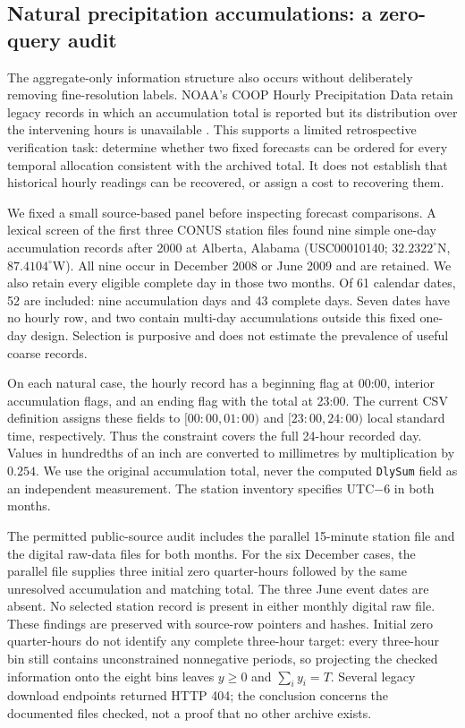 \documentclass[12pt]{article}
\begin{document}
\subsection{Natural precipitation accumulations: a zero-query audit}
\label{sec:noaa-natural}
The aggregate-only information structure also occurs without deliberately
removing fine-resolution labels. NOAA's COOP Hourly Precipitation Data retain
legacy records in which an accumulation total is reported but its distribution
over the intervening hours is unavailable \cite{noaa_hpd_v2,noaa_hpd_format}.
This supports a limited retrospective verification task: determine whether two
fixed forecasts can be ordered for every temporal allocation consistent with
the archived total. It does not establish that historical hourly readings can
be recovered, or assign a cost to recovering them.

We fixed a small source-based panel before inspecting forecast comparisons.
A lexical screen of the first three CONUS station files found nine simple
one-day accumulation records after 2000 at Alberta, Alabama
(USC00010140; $32.2322^{\circ}$N, $87.4104^{\circ}$W). All nine occur in December
2008 or June 2009 and are retained. We also retain every eligible complete day
in those two months. Of 61 calendar dates, 52 are included: nine accumulation
days and 43 complete days. Seven dates have no hourly row, and two contain
multi-day accumulations outside this fixed one-day design. Selection is
purposive and does not estimate the prevalence of useful coarse records.

On each natural case, the hourly record has a beginning flag at 00:00,
interior accumulation flags, and an ending flag with the total at 23:00.
The current CSV definition assigns these fields to $[00{:}00,01{:}00)$ and
$[23{:}00,24{:}00)$ local standard time, respectively. Thus the constraint
covers the full 24-hour recorded day. Values in hundredths of an inch are
converted to millimetres by multiplication by $0.254$. We use the original
accumulation total, never the computed \texttt{DlySum} field as an independent
measurement. The station inventory specifies UTC$-6$ in both months.

The permitted public-source audit includes the parallel 15-minute station
file and the digital raw-data files for both months. For the six December
cases, the parallel file supplies three initial zero quarter-hours followed
by the same unresolved accumulation and matching total. The three June
event dates are absent. No selected station record is present in either
monthly digital raw file. These findings are preserved with source-row
pointers and hashes. Initial zero quarter-hours do not identify any complete
three-hour target: every three-hour bin still contains unconstrained
nonnegative periods, so projecting the checked information onto the eight
bins leaves $y\geq0$ and $\sum_i y_i=T$. Several legacy download endpoints
returned HTTP 404; the conclusion concerns the documented files checked,
not a proof that no other archive exists.
\end{document}
